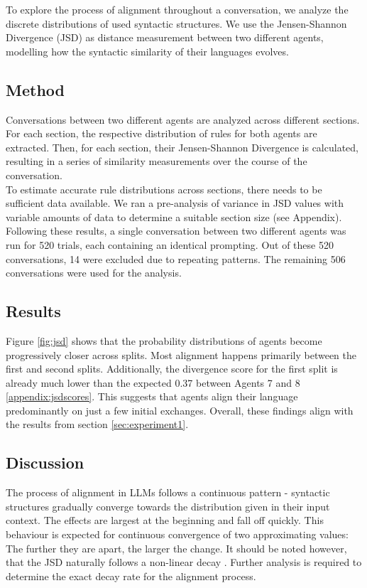 \documentclass[11pt]{article}
\begin{document}
To explore the process of alignment throughout a conversation, we analyze the discrete distributions of used syntactic structures. We use the Jensen-Shannon Divergence (JSD) as distance measurement between two different agents, modelling how the syntactic similarity of their languages evolves.
\subsection{Method}
Conversations between two different agents are analyzed across different sections. For each section, the respective distribution of rules for both agents are extracted. Then, for each section, their Jensen-Shannon Divergence is calculated, resulting in a series of similarity measurements over the course of the conversation.\\
To estimate accurate rule distributions across sections, there needs to be sufficient data available. We ran a pre-analysis of variance in JSD values with variable amounts of data to determine a suitable section size (see Appendix). Following these results, a single conversation between two different agents was run for 520 trials, each containing an identical prompting. Out of these 520 conversations, 14 were excluded due to repeating patterns. The remaining 506 conversations were used for the analysis.

\subsection{Results}
Figure \ref{fig:jsd} shows that the probability distributions of agents become progressively closer across splits.
Most alignment happens primarily between the first and second splits.
Additionally, the divergence score for the first split is already much lower than the expected 0.37 between Agents 7 and 8 \ref{appendix:jsdscores}. This suggests that agents align their language predominantly on just a few initial exchanges. Overall, these findings align with the results from section \ref{sec:experiment1}.


\subsection{Discussion}
The process of alignment in LLMs follows a continuous pattern - syntactic structures gradually converge towards the distribution given in their input context.
The effects are largest at the beginning and fall off quickly. This behaviour is expected for continuous convergence of two approximating values: The further they are apart, the larger the change. It should be noted however, that the JSD naturally follows a non-linear decay \cite{lin1991divergence}. Further analysis is required to determine the exact decay rate for the alignment process.
\end{document}
